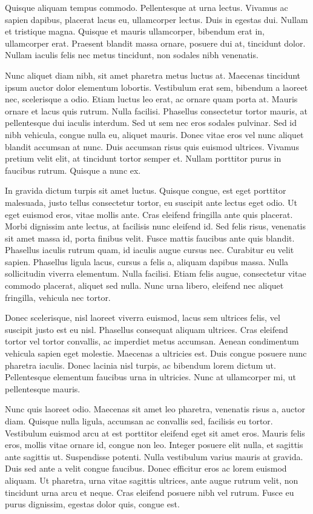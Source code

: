 \documentclass{article}
\begin{document}
Quisque aliquam tempus commodo. Pellentesque at urna lectus. Vivamus ac sapien dapibus, placerat lacus eu, ullamcorper lectus. Duis in egestas dui. Nullam et tristique magna. Quisque et mauris ullamcorper, bibendum erat in, ullamcorper erat. Praesent blandit massa ornare, posuere dui at, tincidunt dolor. Nullam iaculis felis nec metus tincidunt, non sodales nibh venenatis.

Nunc aliquet diam nibh, sit amet pharetra metus luctus at. Maecenas tincidunt ipsum auctor dolor elementum lobortis. Vestibulum erat sem, bibendum a laoreet nec, scelerisque a odio. Etiam luctus leo erat, ac ornare quam porta at. Mauris ornare et lacus quis rutrum. Nulla facilisi. Phasellus consectetur tortor mauris, at pellentesque dui iaculis interdum. Sed ut sem nec eros sodales pulvinar. Sed id nibh vehicula, congue nulla eu, aliquet mauris. Donec vitae eros vel nunc aliquet blandit accumsan at nunc. Duis accumsan risus quis euismod ultrices. Vivamus pretium velit elit, at tincidunt tortor semper et. Nullam porttitor purus in faucibus rutrum. Quisque a nunc ex.

In gravida dictum turpis sit amet luctus. Quisque congue, est eget porttitor malesuada, justo tellus consectetur tortor, eu suscipit ante lectus eget odio. Ut eget euismod eros, vitae mollis ante. Cras eleifend fringilla ante quis placerat. Morbi dignissim ante lectus, at facilisis nunc eleifend id. Sed felis risus, venenatis sit amet massa id, porta finibus velit. Fusce mattis faucibus ante quis blandit. Phasellus iaculis rutrum quam, id iaculis augue cursus nec. Curabitur eu velit sapien. Phasellus ligula lacus, cursus a felis a, aliquam dapibus massa. Nulla sollicitudin viverra elementum. Nulla facilisi. Etiam felis augue, consectetur vitae commodo placerat, aliquet sed nulla. Nunc urna libero, eleifend nec aliquet fringilla, vehicula nec tortor.

Donec scelerisque, nisl laoreet viverra euismod, lacus sem ultrices felis, vel suscipit justo est eu nisl. Phasellus consequat aliquam ultrices. Cras eleifend tortor vel tortor convallis, ac imperdiet metus accumsan. Aenean condimentum vehicula sapien eget molestie. Maecenas a ultricies est. Duis congue posuere nunc pharetra iaculis. Donec lacinia nisl turpis, ac bibendum lorem dictum ut. Pellentesque elementum faucibus urna in ultricies. Nunc at ullamcorper mi, ut pellentesque mauris.

Nunc quis laoreet odio. Maecenas sit amet leo pharetra, venenatis risus a, auctor diam. Quisque nulla ligula, accumsan ac convallis sed, facilisis eu tortor. Vestibulum euismod arcu at est porttitor eleifend eget sit amet eros. Mauris felis eros, mollis vitae ornare id, congue non leo. Integer posuere elit nulla, et sagittis ante sagittis ut. Suspendisse potenti. Nulla vestibulum varius mauris at gravida. Duis sed ante a velit congue faucibus. Donec efficitur eros ac lorem euismod aliquam. Ut pharetra, urna vitae sagittis ultrices, ante augue rutrum velit, non tincidunt urna arcu et neque. Cras eleifend posuere nibh vel rutrum. Fusce eu purus dignissim, egestas dolor quis, congue est.
\end{document}
